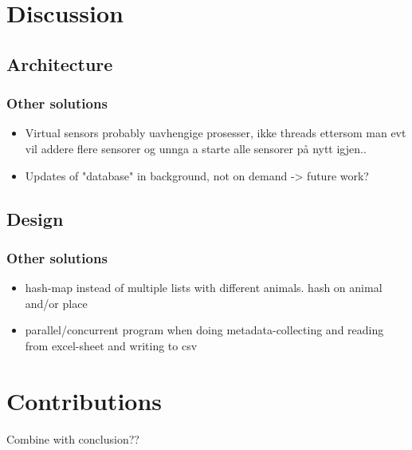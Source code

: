 \documentclass[USenglish]{uit-thesis}
\begin{document}
\chapter{Discussion}

\section{Architecture}
\subsection{Other solutions}
\begin{itemize}
\item Virtual sensors probably uavhengige prosesser, ikke threads ettersom man evt vil addere flere sensorer og unnga a starte alle sensorer på nytt igjen..
\item Updates of "database" in background, not on demand -> future work?
\end{itemize}

\section{Design}
\subsection{Other solutions}
\begin{itemize}
\item hash-map instead of multiple lists with different animals. hash on animal and/or place
\item parallel/concurrent program when doing metadata-collecting and reading from excel-sheet and writing to csv
\end{itemize}



\chapter{Contributions}
Combine with conclusion??
\end{document}
